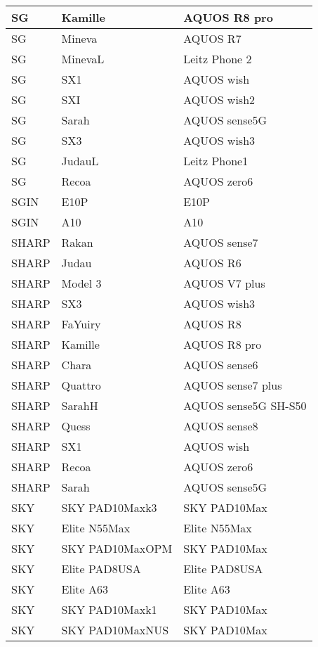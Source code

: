 \begin{tabularx}{\linewidth}{|l|X|X|}
        SG & Kamille & AQUOS R8 pro \\ \hline
        SG & Mineva & AQUOS R7 \\ \hline
        SG & MinevaL & Leitz Phone 2 \\ \hline
        SG & SX1 & AQUOS wish \\ \hline
        SG & SXI & AQUOS wish2 \\ \hline
        SG & Sarah & AQUOS sense5G \\ \hline
        SG & SX3 & AQUOS wish3 \\ \hline
        SG & JudauL & Leitz Phone1 \\ \hline
        SG & Recoa & AQUOS zero6 \\ \hline
        SGIN & E10P & E10P \\ \hline
        SGIN & A10 & A10 \\ \hline
        SHARP & Rakan & AQUOS sense7 \\ \hline
        SHARP & Judau & AQUOS R6 \\ \hline
        SHARP & Model 3 & AQUOS V7 plus \\ \hline
        SHARP & SX3 & AQUOS wish3 \\ \hline
        SHARP & FaYuiry & AQUOS R8 \\ \hline
        SHARP & Kamille & AQUOS R8 pro \\ \hline
        SHARP & Chara & AQUOS sense6 \\ \hline
        SHARP & Quattro & AQUOS sense7 plus \\ \hline
        SHARP & SarahH & AQUOS sense5G SH-S50 \\ \hline
        SHARP & Quess & AQUOS sense8 \\ \hline
        SHARP & SX1 & AQUOS wish \\ \hline
        SHARP & Recoa & AQUOS zero6 \\ \hline
        SHARP & Sarah & AQUOS sense5G \\ \hline
        SKY & SKY PAD10Maxk3 & SKY PAD10Max \\ \hline
        SKY & Elite N55Max & Elite N55Max \\ \hline
        SKY & SKY PAD10MaxOPM & SKY PAD10Max \\ \hline
        SKY & Elite PAD8USA & Elite PAD8USA \\ \hline
        SKY & Elite A63 & Elite A63 \\ \hline
        SKY & SKY PAD10Maxk1 & SKY PAD10Max \\ \hline
        SKY & SKY PAD10MaxNUS & SKY PAD10Max \\ \hline

\end{tabularx}
